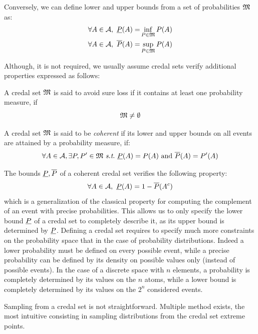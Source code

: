 Conversely, we can define lower and upper bounds from a set of probabilities ${\mathfrak{M}}$ as:
\begin{align*}
    \forall A\in\mathcal{A},~{\underline{P}}(A) =& \inf_{P\in{\mathfrak{M}}}P(A)\\
    \forall A\in\mathcal{A},~\overline{P}(A) =& \sup_{P\in{\mathfrak{M}}}P(A)
\end{align*}

Although, it is not required, we usually assume credal sets verify additional properties expressed as follows:
\begin{definition}\label{def:coherence_sure_loss}
    A credal set ${\mathfrak{M}}$ is said to avoid sure loss if it contains at least one probability measure, \ie if
    \begin{equation}
        {\mathfrak{M}} \neq \emptyset\label{eq:avoid_sure_loss}
    \end{equation}
    
    A credal set ${\mathfrak{M}}$ is said to be \textit{coherent} if its lower and upper bounds on all events are attained by a probability measure, \ie if:
    \begin{equation}
        \forall A\in\mathcal{A}, \exists P, P'\in\M~\st~\low(A)=P(A) \text{ and } \overline{P}(A)=P'(A) 
    \end{equation}
\end{definition}
The bounds ${\underline{P}}, \overline{P}$ of a coherent credal set verifies the following property:
\begin{equation}
    \forall A\in\mathcal{A}, ~{\underline{P}}(A) = 1 - \overline{P}(A^c)\label{eq:lower_proba_complement}
\end{equation}
which is a generalization of the classical property for computing the complement of an event with precise probabilities. This allows us to only specify the lower bound ${\underline{P}}$ of a credal set to completely describe it, as its upper bound is determined by ${\underline{P}}$. Defining a credal set requires to specify much more constraints on the probability space that in the case of probability distributions. Indeed a lower probability must be defined on every possible event, while a precise probability can be defined by its density on possible values only (instead of possible events). In the case of a discrete space with $n$ elements, a probability is completely determined by its values on the $n$ atoms, while a lower bound is completely determined by its values on the $2^n$ considered events.


\begin{remark}
    Sampling from a credal set is not straightforward. Multiple method exists, the most intuitive consisting in sampling distributions from the credal set extreme points.
\end{remark}

